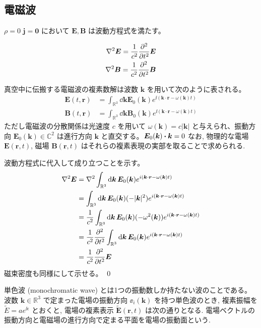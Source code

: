 \documentclass[uplatex,dvipdfmx,a4paper,11pt]{jlreq}
\makeatletter
\newcommand{\CC}{\mathbb{C}}
\newcommand{\RR}{\mathbb{R}}
\newcommand{\EE}{\bm{E}}
\newcommand{\BB}{\bm{B}}
\newcommand{\rr}{\bm{r}}
\newcommand{\kk}{\bm{k}}
\theoremstyle{definition}
\renewenvironment{proof}[1][\proofname]{\par
  \normalfont
  \topsep6\p@\@plus6\p@ \trivlist
  \item[\hskip\labelsep{\bfseries #1}\@addpunct{\bfseries}]\ignorespaces\quad\par
}{%
  \qed\endtrivlist\@endpefalse
}
\renewcommand\proofname{証明}
\makeatother
\begin{document}
\subsection{電磁波}
\begin{proposition}
  $\rho = 0$ $\bm{j} = \bm{0}$ において $\EE, \BB$ は波動方程式を満たす。
\end{proposition}
\begin{align}
  \nabla^2\EE = \frac{1}{c^2}\pdv[2]{t}\EE \\
  \nabla^2\BB = \frac{1}{c^2}\pdv[2]{t}\BB
\end{align}

\begin{theorem}[]
  真空中に伝搬する電磁波の複素数解は波数 $\kk$ を用いて次のように表される。
  \begin{align}
    \EE(t, \rr) & = \int_{\RR^3}\dd{\kk}\EE_0(\kk)e^{\ii(\kk\cdot\rr - \omega(\kk)t)} \\
    \BB(t, \rr) & = \int_{\RR^3}\dd{\kk}\BB_0(\kk)e^{\ii(\kk\cdot\rr - \omega(\kk)t)}
  \end{align}
  ただし電磁波の分散関係は光速度 $c$ を用いて $\omega(\kk) = c|\kk|$ と与えられ、振動方向 $\EE_0(\kk)\in\CC^2$ は進行方向 $\kk$ と直交する。$\EE_0(\kk)\vdot\kk = 0$
  なお, 物理的な電場 $\EE(\rr, t)$, 磁場 $\BB(\rr, t)$ はそれらの複素表現の実部を取ることで求められる.
\end{theorem}
\begin{proof}
  波動方程式に代入して成り立つことを示す。
  \begin{align}
    \nabla^2\EE & = \nabla^2\int_{\RR^3}\dd{\kk}\EE_0(\kk)e^{\ii(\kk\cdot\rr - \omega(\kk)t)}                      \\
                & = \int_{\RR^3}\dd{\kk}\EE_0(\kk)(-|\kk|^2)e^{\ii(\kk\cdot\rr - \omega(\kk)t)}                    \\
                & = \frac{1}{c^2}\int_{\RR^3}\dd{\kk}\EE_0(\kk)(-\omega^2(\kk))e^{\ii(\kk\cdot\rr - \omega(\kk)t)} \\
                & = \frac{1}{c^2}\pdv[2]{t}\int_{\RR^3}\dd{\kk}\EE_0(\kk)e^{\ii(\kk\cdot\rr - \omega(\kk)t)}       \\
                & = \frac{1}{c^2}\pdv[2]{t}\EE
  \end{align}
  磁束密度も同様にして示せる。
\end{proof}

\begin{definition}[単色波]
  単色波 (monochromatic wave) とは1つの振動数しか持たない波のことである。
  波数 $\kk\in\RR^3$ で定まった電場の振動方向 $\ee_i(\kk)$ を持つ単色波のとき, 複素振幅を $\tilde{E} = ae^{\ii\epsilon}$ とおくと, 電場の複素表示 $\tilde{\EE}(\rr, t)$ は次の通りとなる.
  電場ベクトルの振動方向と電磁場の進行方向で定まる平面を電場の振動面という.
\end{definition}
\end{document}
